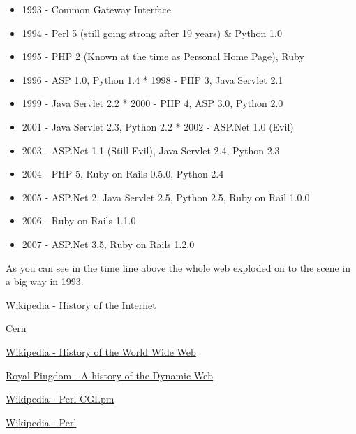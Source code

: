 \documentclass{book}
\begin{document}
\begin{itemize}
\item 1993 - Common Gateway Interface 
\item 1994 - Perl 5 (still going strong after 19 years) \& Python 1.0 
\item 1995 - PHP 2 (Known at the time as Personal Home Page), Ruby 
\item 1996 - ASP 1.0, Python 1.4 * 1998 - PHP 3, Java Servlet 2.1 
\item 1999 - Java Servlet 2.2 * 2000 - PHP 4, ASP 3.0, Python 2.0
\item 2001 - Java Servlet 2.3, Python 2.2 * 2002 - ASP.Net 1.0 (Evil)
\item 2003 - ASP.Net 1.1 (Still Evil), Java Servlet 2.4, Python 2.3 
\item 2004 - PHP 5, Ruby on Rails 0.5.0, Python 2.4 
\item 2005 - ASP.Net 2, Java Servlet 2.5, Python 2.5, Ruby on Rail 1.0.0 
\item 2006 - Ruby on Rails 1.1.0
\item 2007 - ASP.Net 3.5, Ruby on Rails 1.2.0
\end{itemize}

As you can see in the time line above the whole web exploded on to the scene in a big way in 1993.


\begin{thebibliography}{56}
\href{http://en.wikipedia.org/wiki/History_of_the_Internet}{Wikipedia - History of the Internet}

\href{http://info.cern.ch/}{Cern}

\href{http://en.wikipedia.org/wiki/History_of_the_World_Wide_Web}{Wikipedia - History of the World Wide Web}

\href{http://royal.pingdom.com/2007/12/07/a-history-of-the-dynamic-web/}{Royal Pingdom - A history of the Dynamic Web}

\href{http://en.wikipedia.org/wiki/CGI.pm}{Wikipedia - Perl CGI.pm}

\href{http://en.wikipedia.org/wiki/Perl}{Wikipedia - Perl}
\end{thebibliography}
\end{document}
